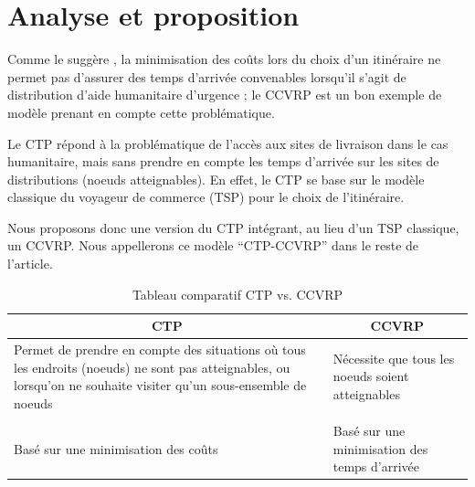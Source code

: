 \documentclass[12pt, a4paper, onecolumn, twoside,french,cleardoublepage=plain,openany]{article}
\begin{document}
\section{Analyse et proposition}

Comme le suggère \cite{campbell_routing_2008}, la minimisation des coûts lors du choix d’un itinéraire ne permet pas d’assurer des temps d’arrivée convenables lorsqu’il s’agit de distribution d’aide humanitaire d’urgence ; le CCVRP est un bon exemple de modèle prenant en compte cette problématique.

Le CTP répond à la problématique de l’accès aux sites de livraison dans le cas humanitaire, mais sans prendre en compte les temps d’arrivée sur les sites de distributions (noeuds atteignables). En effet, le CTP se base sur le modèle classique du voyageur de commerce (TSP) pour le choix de l’itinéraire.

Nous proposons donc une version du CTP intégrant, au lieu d’un TSP classique, un CCVRP. Nous appellerons ce modèle \enquote{CTP-CCVRP} dans le reste de l'article.
\begin{table}[h] \centering \begin{tabular}{p{8cm} p{5cm}} \toprule
\multicolumn{1}{c}{CTP} & \multicolumn{1}{c}{CCVRP} \\ \midrule
Permet de prendre en compte des situations où tous les endroits (noeuds) ne sont pas atteignables, ou lorsqu'on ne souhaite visiter qu'un sous-ensemble de noeuds & Nécessite que tous les noeuds soient atteignables \\ \\
Basé sur une minimisation des coûts & Basé sur une minimisation des temps d'arrivée \\ \bottomrule
\end{tabular} \caption{Tableau comparatif CTP vs. CCVRP} \label{comparatif}
\end{table}
\end{document}
